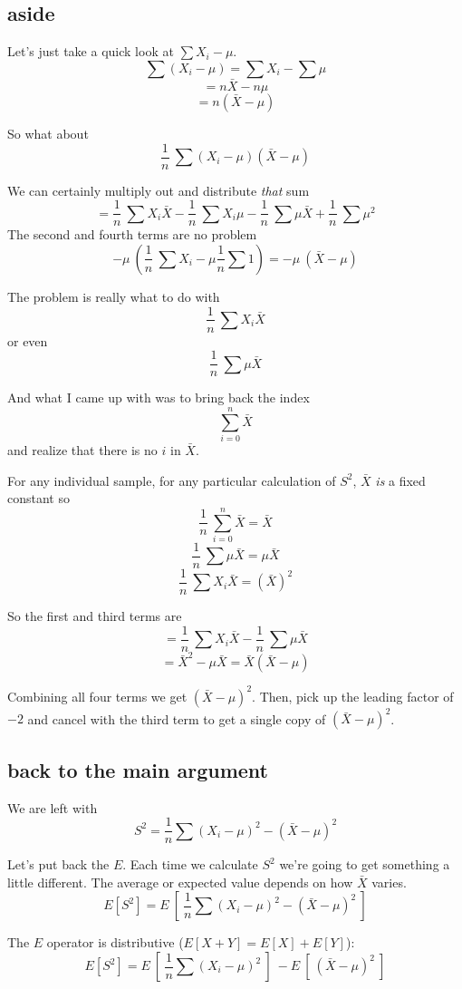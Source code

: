 \documentclass[11pt, oneside]{article}
\begin{document}
\subsection*{aside}

Let's just take a quick look at $\sum X_i - \mu$.
\[ \sum (X_i - \mu) = \sum X_i - \sum \mu \]
\[  = n \bar{X} - n \mu  \]
\[ = n (\bar{X} - \mu) \]

So what about
\[ \frac{1}{n} \ \sum (X_i - \mu)(\bar{X} - \mu) \]

We can certainly multiply out and distribute \emph{that} sum
\[ = \frac{1}{n} \ \sum X_i \bar{X} - \frac{1}{n} \ \sum X_i \mu - \frac{1}{n} \ \sum \mu \bar{X} + \frac{1}{n} \ \sum \mu^2 \]
The second and fourth terms are no problem
\[ - \mu \ (\frac{1}{n} \  \sum X_i - \mu \frac{1}{n}  \sum 1) = -\mu \ (\bar{X} - \mu) \]

The problem is really what to do with
\[ \frac{1}{n} \ \sum X_i \bar{X} \]
or even
\[ \frac{1}{n} \ \sum \mu \bar{X} \]

And what I came up with was to bring back the index
\[ \sum_{i = 0}^{n} \bar{X} \]
and realize that there is no $i$ in $\bar{X}$.  

For any individual sample, for any particular calculation of $S^2$, $\bar{X}$ \emph{is} a fixed constant so
\[ \frac{1}{n} \ \sum_{i = 0}^{n}  \bar{X} = \bar{X} \]
\[ \frac{1}{n} \ \sum \mu \bar{X} = \mu \bar{X} \]
\[ \frac{1}{n} \ \sum X_i \bar{X}  = (\bar{X})^2 \]

So the first and third terms are
\[ = \frac{1}{n} \ \sum X_i \bar{X} - \frac{1}{n} \ \sum \mu \bar{X} \]
\[ = \bar{X}^2 - \mu \bar{X} = \bar{X} (\bar X - \mu) \]

Combining all four terms we get $(\bar{X} - \mu)^2$.  Then, pick up the leading factor of $-2$ and cancel with the third term to get a single copy of $(\bar{X} - \mu)^2$.

\subsection*{back to the main argument}

We are left with
\[ S^2 = \frac{1}{n} \sum (X_i - \mu)^2 - (\bar{X} - \mu)^2 \]

Let's put back the $E$.  Each time we calculate $S^2$ we're going to get something a little different.  The average or expected value depends on how $\bar{X}$ varies.
\[ E[S^2] = E \ [\ \frac{1}{n} \sum (X_i - \mu)^2 - (\bar{X} - \mu)^2 \ ] \]

The $E$ operator is distributive ($E[X+Y] = E[X] + E[Y]$):
\[ E[S^2] = E \ [\ \frac{1}{n} \sum (X_i - \mu)^2 \ ] \  - E \ [ \ (\bar{X} - \mu)^2 \ ] \]
\end{document}
